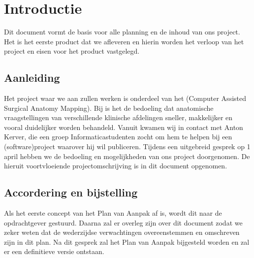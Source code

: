 \section{Introductie}



Dit document vormt de basis voor alle planning en de inhoud van ons project.
Het is het eerste product dat we afleveren en hierin worden het verloop van het project en eisen voor het product vastgelegd.

\subsection{Aanleiding}

Het project waar we aan zullen werken is onderdeel van het \casamproject (Computer Assisted Surgical Anatomy Mapping). 
Bij \casam is het de bedoeling dat anatomische vraagstellingen van verschillende klinische afdelingen sneller, makkelijker en vooral duidelijker worden behandeld.
Vanuit \casam kwamen wij in contact met Anton Kerver, die een groep Informaticastudenten zocht om hem te helpen bij een (software)project waarover hij wil publiceren.
Tijdens een uitgebreid gesprek op 1 april hebben we de bedoeling en mogelijkheden van ons project doorgenomen.
De hieruit voortvloeiende projectomschrijving is in dit document opgenomen.

\subsection{Accordering en bijstelling}

Als het eerste concept van het Plan van Aanpak af is, wordt dit naar de opdrachtgever gestuurd.
Daarna zal er overleg zijn over dit document zodat we zeker weten dat de wederzijdse verwachtingen overeenstemmen en omschreven zijn in dit plan.
Na dit gesprek zal het Plan van Aanpak bijgesteld worden en zal er een definitieve versie ontstaan.

